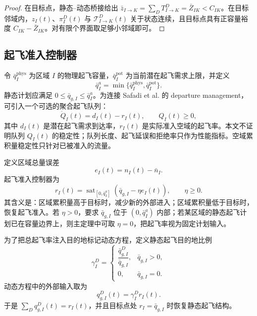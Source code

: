 \documentclass[a4paper,12pt]{article}
\theoremstyle{plain}
\theoremstyle{definition}
\theoremstyle{remark}
\begin{document}
\begin{proof}
在目标点，静态--动态桥接给出 $\bar z_{I\to K}=\sum_D T_{I\to K}^D=\bar Z_{IK}<C_{IK}$。在目标邻域内，$z_I(t)$、$\pi_I^D(t)$ 与 $\mathcal T_{I\to K}^D(t)$ 关于状态连续，且目标点具有正容量裕度 $C_{IK}-\bar Z_{IK}$。对有限个界面取足够小邻域即可。
\end{proof}

\subsection{起飞准入控制器}

令 $\bar q_I^{\mathrm{phys}}$ 为区域 $I$ 的物理起飞容量，$\bar q_I^{\mathrm{pot}}$ 为当前潜在起飞需求上限，并定义
\begin{equation}\label{eq:takeoff_capacity_v20}
    \bar q_I^a=\min\{\bar q_I^{\mathrm{phys}},\bar q_I^{\mathrm{pot}}\}.
\end{equation}
静态计划应满足 $0\le \bar q_{g,I}\le \bar q_I^a$。为连接 Safadi et al. 的 departure management，可引入一个可选的聚合起飞队列：
\begin{equation}\label{eq:departure_queue}
    \dot Q_I(t)=d_I(t)-r_I(t),\qquad Q_I(t)\ge0,
\end{equation}
其中 $d_I(t)$ 是潜在起飞需求到达率，$r_I(t)$ 是实际准入空域的起飞率。本文不证明队列 $Q_I(t)$ 的稳定性；队列长度、起飞延误和拒绝率只作为性能指标。空域累积量稳定性只针对已被准入的流量。

定义区域总量误差
\begin{equation}\label{eq:total_error_v20}
    e_I(t)=n_I(t)-\bar n_I.
\end{equation}
起飞准入控制器为
\begin{equation}\label{eq:takeoff_controller_v20}
    r_I(t)=
    \operatorname{sat}_{[0,\bar q_I^a]}
    \left(\bar q_{g,I}-\eta e_I(t)\right),
    \qquad \eta\ge0.
\end{equation}
其含义是：区域累积量高于目标时，减少新的外部进入；区域累积量低于目标时，恢复起飞准入。若 $\eta>0$，要求 $\bar q_{g,I}$ 位于 $(0,\bar q_I^a)$ 内部；若某区域的静态起飞计划已在容量边界上，则主定理中可取 $\eta=0$，把起飞率视为固定计划输入。

为了把总起飞率注入目的地标记动态方程，定义静态起飞目的地比例
\begin{equation}\label{eq:departure_destination_share}
    \gamma_I^D=
    \begin{cases}
    \dfrac{\bar q_{g,I}^D}{\bar q_{g,I}}, & \bar q_{g,I}>0,\\[0.8em]
    0, & \bar q_{g,I}=0.
    \end{cases}
\end{equation}
动态方程中的外部输入取为
\begin{equation}\label{eq:controlled_departure_component}
    q_{g,I}^D(t)=\gamma_I^D r_I(t).
\end{equation}
于是 $\sum_D q_{g,I}^D(t)=r_I(t)$，并且目标点处 $r_I=\bar q_{g,I}$ 时恢复静态起飞结构。
\end{document}
